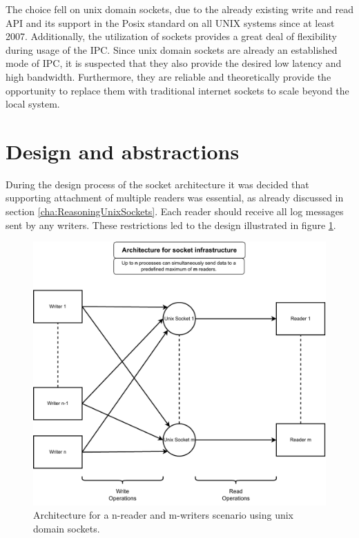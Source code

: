 The choice fell on unix domain sockets, due to the already existing write and read \ac{API} and its support in the Posix standard on all UNIX systems since at least 2007\cite{posix}.
Additionally, the utilization of sockets provides a great deal of flexibility during usage of the \ac{IPC}.
Since unix domain sockets are already an established mode of \ac{IPC}, it is suspected that they also provide the desired low latency and high bandwidth.
Furthermore, they are reliable\cite{man:unixsockets} and theoretically provide the opportunity to replace them with traditional internet sockets to scale beyond the local system.

\section{Design and abstractions}
\label{sec:Design_and_abstractions}
During the design process of the socket architecture it was decided that supporting attachment of multiple readers was essential, as already discussed in section \ref{cha:ReasoningUnixSockets}.
Each reader should receive all log messages sent by any writers.
These restrictions led to the design illustrated in figure \ref{fig:socket:architecture}.

\begin{figure}[h!]
    \centerline{\includegraphics[width=1.2\textwidth]{images/SocketArchitecture.pdf}}
    \caption[General design of socket architecture]{
        Architecture for a n-reader and m-writers scenario using unix domain sockets.}
	\label{fig:socket:architecture}
\end{figure}

